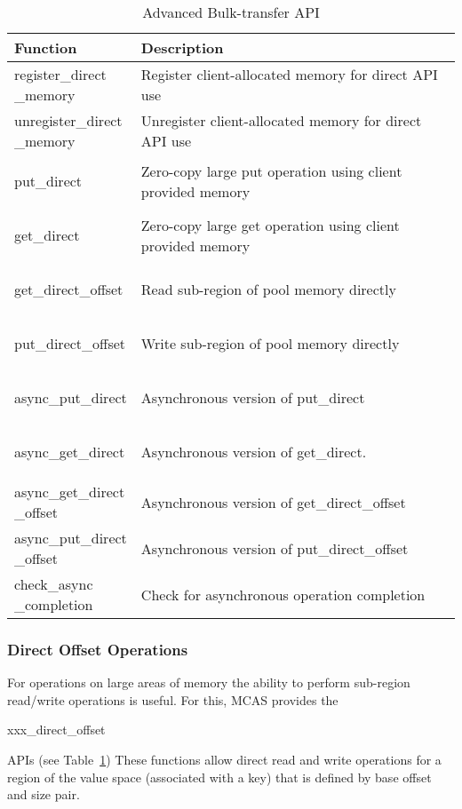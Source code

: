 \documentclass[letterpaper,twocolumn,10pt]{article}
\newcommand{\code}[1]{\begin{ttcodefont}#1\end{ttcodefont}}
\newcommand{\smallcode}[1]{\begin{ttsmallcodefont}#1\end{ttsmallcodefont}}
\begin{document}
\begin{table}[t]
\begin{centering}
\begin{tabularx}{1.0\linewidth}{
>{\setlength{\hsize}{.3\hsize}\raggedright\footnotesize}X
>{\setlength{\hsize}{.7\hsize}\raggedright\arraybackslash\footnotesize}X }
  \hline
  \textbf{Function} & \textbf{Description} \\
  \hline
  \smallcode{register\_direct\\\_memory} & Register client-allocated memory for direct API use\\
  \smallcode{unregister\_direct\\\_memory} & Unregister client-allocated memory for direct API use\\
  \smallcode{put\_direct} & Zero-copy large put operation using client provided memory \\
  \smallcode{get\_direct} & Zero-copy large get operation using client provided memory \\
  \smallcode{get\_direct\_offset} & Read sub-region of pool memory directly \\
  \smallcode{put\_direct\_offset} & Write sub-region of pool memory directly \\  
  \hline
  \smallcode{async\_put\_direct} & Asynchronous version of put\_direct \\
  \smallcode{async\_get\_direct} & Asynchronous version of get\_direct. \\
  \smallcode{async\_get\_direct\\\_offset} & Asynchronous version of get\_direct\_offset \\
  \smallcode{async\_put\_direct\\\_offset} & Asynchronous version of put\_direct\_offset \\
  \smallcode{check\_async\\\_completion} & Check for asynchronous operation completion \\
  \hline
\end{tabularx}
\caption{Advanced Bulk-transfer API}
\label{tab:clientbulkapi}
\end{centering}
\end{table}

\subsubsection{Direct Offset Operations}

For operations on large areas of memory the ability to perform
sub-region read/write operations is useful.  For this, MCAS provides
the \code{xxx\_direct\_offset} APIs (see Table~\ref{tab:clientbulkapi})
These functions allow direct read and write operations for a region of the value
space (associated with a key) that is defined by base offset and size pair.
\end{document}
